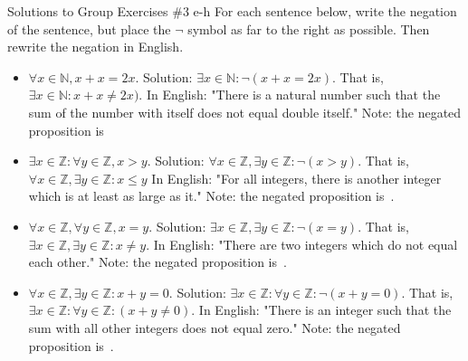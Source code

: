 \documentclass[10pt]{beamer}
\begin{document}
\begin{frame}{Solutions to Group Exercises \#3 e-h}
\small 
For each sentence below, write the negation of the sentence, but place the $\lnot$ symbol as far to the right as possible. Then rewrite the negation in English. 
    \begin{itemize}
     \item[e.] $\forall x \in \mathbb{N}, x+x=2x.$ \alert{Solution: $\exists x \in \mathbb{N}: \lnot (x+x=2x)$.  That is, $\exists x \in \mathbb{N}: x+x \neq 2x)$.  In English: "There is a natural number such that the sum of the number with itself does not equal double itself."  Note: the negated proposition is}\,  
        \item[f.] $\exists x \in \mathbb{Z}: \forall y \in \mathbb{Z}, x>y.$ \alert{Solution: $\forall x \in \mathbb{Z}, \exists y \in \mathbb{Z} : \lnot (x>y)$.   That is, $\forall x \in \mathbb{Z}, \exists y \in \mathbb{Z} : x\leq y$ In English: "For all integers, there is another integer which is at least as large as it."  Note: the negated proposition is}\, .  
        \item[g.]  $\forall x \in \mathbb{Z}, \forall y \in \mathbb{Z}, x=y.$ \alert{Solution: $\exists x \in \mathbb{Z}, \exists y \in \mathbb{Z} : \lnot (x=y)$.   That is, $\exists x \in \mathbb{Z}, \exists y \in \mathbb{Z} : x\neq y$. In English: "There are two integers which do not equal each other."  Note: the negated proposition is}\, .  
        \item[h.] $\forall x \in \mathbb{Z}, \exists y \in \mathbb{Z}: x+y=0.$ \alert{Solution: $\exists x \in \mathbb{Z}: \forall y \in \mathbb{Z} : \lnot (x+y=0)$.   That is, $\exists x \in \mathbb{Z}: \forall y \in \mathbb{Z} : (x+y \neq 0)$.  In English: "There is an integer such that the sum with all other integers does not equal zero."  Note: the negated proposition is}\, .  

        \end{itemize}
\end{frame}
\end{document}
